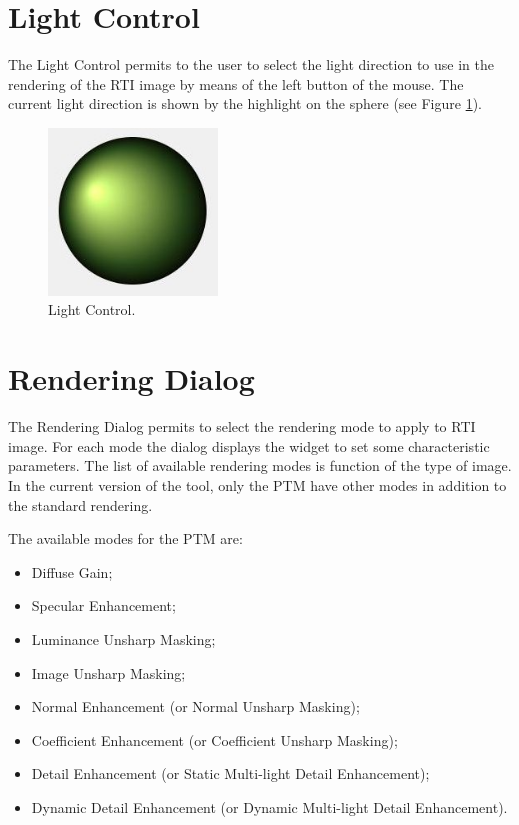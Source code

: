 \documentclass[oneside, 11pt]{book}
\begin{document}
\section{Light Control}
The Light Control permits to the user to select the light direction to use in the rendering of the RTI image by means of the left button of the mouse. The current light direction is shown by the highlight on the sphere (see Figure \ref{fig:lightcontrol}).

\begin{figure}[hbt]
  \centering
  \includegraphics[width=0.4\textwidth]{lightcontrol}
  \caption{Light Control.}
  \label{fig:lightcontrol}
\end{figure}

\section{Rendering Dialog}
The Rendering Dialog permits to select the rendering mode to apply to RTI image. For each mode the dialog displays the widget to set some characteristic parameters. The list of available rendering modes is function of the type of image. In the current version of the tool, only the PTM have other modes in addition to the standard rendering.

The available modes for the PTM are:
\begin{itemize}
\item Diffuse Gain;
\item Specular Enhancement;
\item Luminance Unsharp Masking;
\item Image Unsharp Masking;
\item Normal Enhancement (or Normal Unsharp Masking);
\item Coefficient Enhancement (or Coefficient Unsharp Masking);
\item Detail Enhancement (or Static Multi-light Detail Enhancement);
\item Dynamic Detail Enhancement (or Dynamic Multi-light Detail Enhancement).
\end{itemize}
\end{document}

